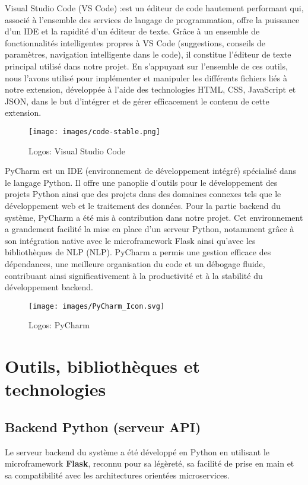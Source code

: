Visual Studio Code (VS Code) :est un éditeur de code hautement performant qui, associé à l'ensemble des services de langage de programmation, offre la puissance d’un IDE et la rapidité d’un éditeur de texte. Grâce à un ensemble de fonctionnalités intelligentes propres à VS Code (suggestions, conseils de paramètres, navigation intelligente dans le code), il constitue l’éditeur de texte principal utilisé dans notre projet. En s’appuyant sur l’ensemble de ces outils, nous l’avons utilisé pour implémenter et manipuler les différents fichiers liés à notre extension, développée à l’aide des technologies HTML, CSS, JavaScript et JSON, dans le but d’intégrer et de gérer efficacement le contenu de cette extension.
\begin{figure}[H]
    \centering
    \texttt{[image: images/code-stable.png]} 
    \caption{Logos: Visual Studio Code } %
    \label{fig:logos} %
\end{figure}

PyCharm est un IDE (environnement de développement intégré) spécialisé dans le langage Python. Il offre une panoplie d'outils pour le développement des projets Python ainsi que des projets dans des domaines connexes tels que le développement web et le traitement des données.
Pour la partie backend du système, PyCharm a été mis à contribution dans notre projet. Cet environnement a grandement facilité la mise en place d'un serveur Python, notamment grâce à son intégration native avec le microframework Flask ainsi qu'avec les bibliothèques de NLP (NLP). PyCharm a permis une gestion efficace des dépendances, une meilleure organisation du code et un débogage fluide, contribuant ainsi significativement à la productivité et à la stabilité du développement backend.

\begin{figure}[H]
    \centering
    \texttt{[image: images/PyCharm\_Icon.svg]} 
    \caption{Logos: PyCharm } %
    \label{fig:logos} %
\end{figure}
\section{Outils, bibliothèques et technologies}
\subsection{Backend Python (serveur API)}
Le serveur backend du système a été développé en Python en utilisant le microframework \textbf{Flask}, reconnu pour sa légèreté, sa facilité de prise en main et sa compatibilité avec les architectures orientées microservices.

